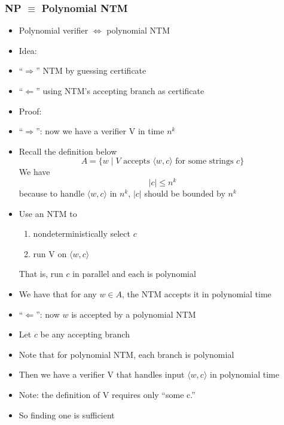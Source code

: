 




\begin{frame}[allowframebreaks] \frametitle{NP $\equiv$ Polynomial NTM}

  \begin{itemize}
\item Polynomial verifier $\Leftrightarrow$ polynomial NTM

\item Idea:

\item [] ``$\Rightarrow$'' NTM by guessing certificate

\item [] ``$\Leftarrow$'' using NTM's accepting branch as  certificate
\item Proof:
\item ``$\Rightarrow$'': now we have a verifier V in time $n^k$

  
\item [] Recall the definition below
    \begin{equation*}
    A=\{w\mid
V \mbox{ accepts } 
\langle  w,c\rangle  
\mbox{ for some strings } c\}
  \end{equation*}
We have
\begin{equation*}
|c|\leq n^k
\end{equation*}
because to handle $\langle  w,c\rangle $ in $n^k$,
$|c|$ should be bounded by $n^k$
\item Use an NTM to
  \begin{enumerate}
  \item nondeterministically select $c$
  \item run V on $\langle  w,c\rangle $
  \end{enumerate}
That is, run $c$ in parallel and each is polynomial
\item We have that for any $w \in A$, the NTM accepts
  it in polynomial time
\item ``$\Leftarrow$'': now $w$ is accepted by a polynomial NTM
\item [] Let $c$ be any accepting branch
\item [] Note that for polynomial NTM, each branch is polynomial
\item Then we have a verifier V that handles input $\langle  w,c\rangle $
in polynomial time

\item Note: the definition of V requires only ``some c.''
\item So finding one is sufficient

\end{itemize}\end{frame}

